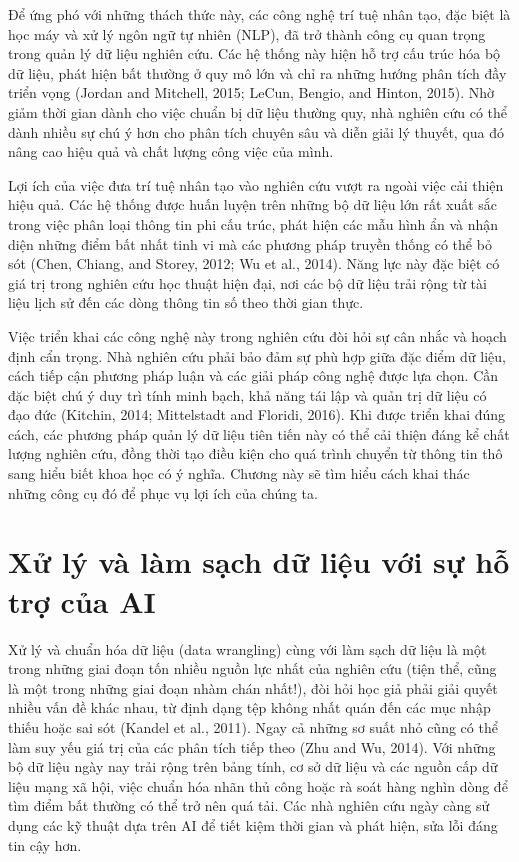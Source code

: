 Để ứng phó với những thách thức này, các công nghệ trí tuệ nhân tạo, đặc biệt là học máy và xử lý ngôn ngữ tự nhiên (NLP), đã trở thành công cụ quan trọng trong quản lý dữ liệu nghiên cứu. Các hệ thống này hiện hỗ trợ cấu trúc hóa bộ dữ liệu, phát hiện bất thường ở quy mô lớn và chỉ ra những hướng phân tích đầy triển vọng (Jordan and Mitchell, 2015; LeCun, Bengio, and Hinton, 2015). Nhờ giảm thời gian dành cho việc chuẩn bị dữ liệu thường quy, nhà nghiên cứu có thể dành nhiều sự chú ý hơn cho phân tích chuyên sâu và diễn giải lý thuyết, qua đó nâng cao hiệu quả và chất lượng công việc của mình.

Lợi ích của việc đưa trí tuệ nhân tạo vào nghiên cứu vượt ra ngoài việc cải thiện hiệu quả. Các hệ thống được huấn luyện trên những bộ dữ liệu lớn rất xuất sắc trong việc phân loại thông tin phi cấu trúc, phát hiện các mẫu hình ẩn và nhận diện những điểm bất nhất tinh vi mà các phương pháp truyền thống có thể bỏ sót (Chen, Chiang, and Storey, 2012; Wu et al., 2014). Năng lực này đặc biệt có giá trị trong nghiên cứu học thuật hiện đại, nơi các bộ dữ liệu trải rộng từ tài liệu lịch sử đến các dòng thông tin số theo thời gian thực.

Việc triển khai các công nghệ này trong nghiên cứu đòi hỏi sự cân nhắc và hoạch định cẩn trọng. Nhà nghiên cứu phải bảo đảm sự phù hợp giữa đặc điểm dữ liệu, cách tiếp cận phương pháp luận và các giải pháp công nghệ được lựa chọn. Cần đặc biệt chú ý duy trì tính minh bạch, khả năng tái lập và quản trị dữ liệu có đạo đức (Kitchin, 2014; Mittelstadt and Floridi, 2016). Khi được triển khai đúng cách, các phương pháp quản lý dữ liệu tiên tiến này có thể cải thiện đáng kể chất lượng nghiên cứu, đồng thời tạo điều kiện cho quá trình chuyển từ thông tin thô sang hiểu biết khoa học có ý nghĩa. Chương này sẽ tìm hiểu cách khai thác những công cụ đó để phục vụ lợi ích của chúng ta.

\section{Xử lý và làm sạch dữ liệu với sự hỗ trợ của AI}

Xử lý và chuẩn hóa dữ liệu (data wrangling) cùng với làm sạch dữ liệu là một trong những giai đoạn tốn nhiều nguồn lực nhất của nghiên cứu (tiện thể, cũng là một trong những giai đoạn nhàm chán nhất!), đòi hỏi học giả phải giải quyết nhiều vấn đề khác nhau, từ định dạng tệp không nhất quán đến các mục nhập thiếu hoặc sai sót (Kandel et al., 2011). Ngay cả những sơ suất nhỏ cũng có thể làm suy yếu giá trị của các phân tích tiếp theo (Zhu and Wu, 2014). Với những bộ dữ liệu ngày nay trải rộng trên bảng tính, cơ sở dữ liệu và các nguồn cấp dữ liệu mạng xã hội, việc chuẩn hóa nhãn thủ công hoặc rà soát hàng nghìn dòng để tìm điểm bất thường có thể trở nên quá tải. Các nhà nghiên cứu ngày càng sử dụng các kỹ thuật dựa trên AI để tiết kiệm thời gian và phát hiện, sửa lỗi đáng tin cậy hơn.

